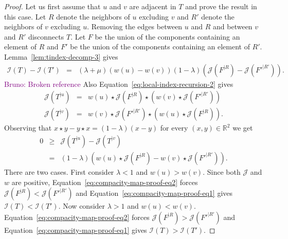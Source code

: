 \documentclass[11 pt]{modarticle}
\newcommand{\cR}{\mathbb{R}}
\newcommand{\wmap}{w}
\newcommand{\rtree}[2]{{#1}^{\lvert #2}}
\newcommand{\indexsymbol}{\mathcal{I}}
\newcommand{\tindex}[1]{\indexsymbol(#1)}
\newcommand{\rindexsymbol}{\mathcal{J}}
\newcommand{\rindex}[2]{\rindexsymbol(\rtree{#2}{#1})}
\newcommand{\bldcomment}[1]{\textcolor{purple}{{\footnotesize Bruno:} #1}}
\begin{document}
\begin{proof}
Let us first assume that $u$ and $v$ are adjacent in $T$ and prove the result in this case. Let $R$ denote the neighbors of $u$ excluding $v$ and $R'$ denote the neighbors of $v$ excluding $u$. Removing the edges between $u$ and $R$ and between $v$ and $R'$ disconnects $T$. Let $F$ be the union of the components containing an element of $R$ and $F'$ be the union of the components containing an element of $R'$. Lemma~\ref{lem:tindex-decomp-3} gives
\begin{eqnarray}
	\tindex{T} - \tindex{T'} & = & (\lambda + \mu)(\wmap(u) - \wmap(v))(1 - \lambda)(\rindex{R}{F} - \rindex{R'}{F'}). \label{eq:compacity-map-proof-eq1}
\end{eqnarray}
\bldcomment{Broken reference}
Also Equation~\eqref{eq:local-index-recursion-2} gives
\begin{eqnarray*}
	\rindex{u}{T} & = & \wmap(u) \star \rindex{R}{F} \star (\wmap(v) \star \rindex{R'}{F'}) \\
	\rindex{v}{T} & = & \wmap(v) \star \rindex{R'}{F'} \star (\wmap(u)\star \rindex{R}{F}).
\end{eqnarray*}
Observing that $ x \star y - y \star x = (1 - \lambda)(x-y)$ for every $(x, y) \in \cR^2$ we get
\begin{eqnarray}
	0 & \geq & \rindex{u}{T} - \rindex{v}{T} \nonumber \\
	& = & (1 - \lambda) \left(\wmap(u) \star \rindex{R}{F} - \wmap(v) \star \rindex{R'}{F'}\right). \label{eq:compacity-map-proof-eq2}
\end{eqnarray}
There are two cases. First consider $\lambda < 1$ and $\wmap(u) > \wmap(v)$.  Since both $\rindexsymbol$ and $\wmap$ are positive, %
Equation~\eqref{eq:compacity-map-proof-eq2} forces $\rindex{R}{F} < \rindex{R'}{F'}$ and Equation~\eqref{eq:compacity-map-proof-eq1} gives $\tindex{T} < \tindex{T'}$. Now consider $\lambda > 1$ and $\wmap(u) < \wmap(v)$. Equation~\eqref{eq:compacity-map-proof-eq2} forces $\rindex{R}{F} > \rindex{R'}{F'}$ and Equation~\eqref{eq:compacity-map-proof-eq1} gives $\tindex{T} > \tindex{T'}$.



\end{proof}
\end{document}
